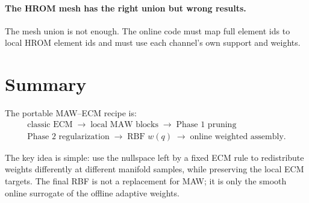 \documentclass[11pt]{article}
\begin{document}
\paragraph{The HROM mesh has the right union but wrong results.}
The mesh union is not enough.  The online code must map full element ids to local
HROM element ids and must use each channel's own support and weights.

\section{Summary}

The portable MAW--ECM recipe is:
\[
\boxed{
\begin{gathered}
\text{classic ECM}
\;\longrightarrow\;
\text{local MAW blocks}
\;\longrightarrow\;
\text{Phase 1 pruning}\\
\text{Phase 2 regularization}
\;\longrightarrow\;
\text{RBF } w(q)
\;\longrightarrow\;
\text{online weighted assembly}.
\end{gathered}
}
\]

The key idea is simple: use the nullspace left by a fixed ECM rule to redistribute
weights differently at different manifold samples, while preserving the local ECM
targets.  The final RBF is not a replacement for MAW; it is only the smooth online
surrogate of the offline adaptive weights.
\end{document}
